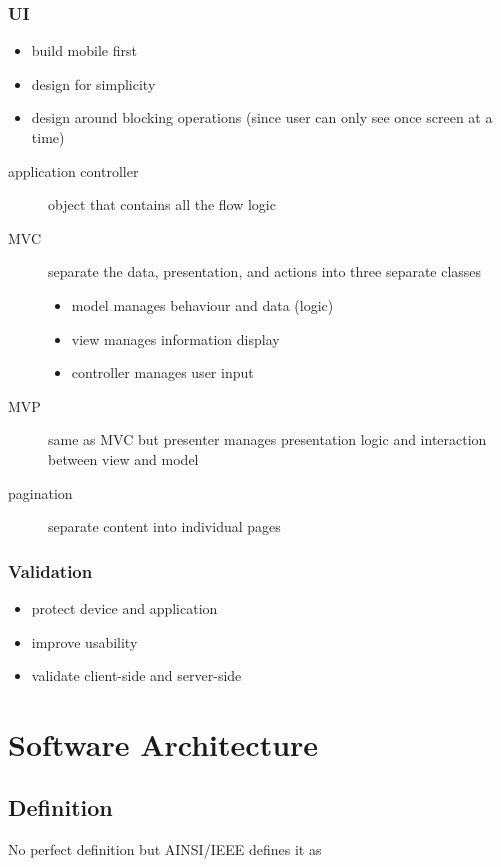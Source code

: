 \documentclass[]{article}
\theoremstyle{definition}
\begin{document}
	\subsubsection{UI}
	\begin{itemize}
		\item build mobile first
		\item design for simplicity
		\item design around blocking operations (since user can only see once screen at a time)
	\end{itemize}
	\begin{description}
		\item[application controller] object that contains all the flow logic 
		\item[MVC] separate the data, presentation, and actions into three separate classes
			\begin{itemize}
				\item model manages behaviour and data (logic)
				\item view manages information display
				\item controller manages user input
			\end{itemize}
		\item[MVP] same as MVC but presenter manages presentation logic and interaction between view and model
		\item[pagination] separate content into individual pages
	\end{description}

	\subsubsection{Validation}
	\begin{itemize}
		\item protect device and application
		\item improve usability
		\item validate client-side and server-side
	\end{itemize}

	\section{Software Architecture}
	\subsection{Definition}
	No perfect definition but AINSI/IEEE defines it as
	
\end{document}
